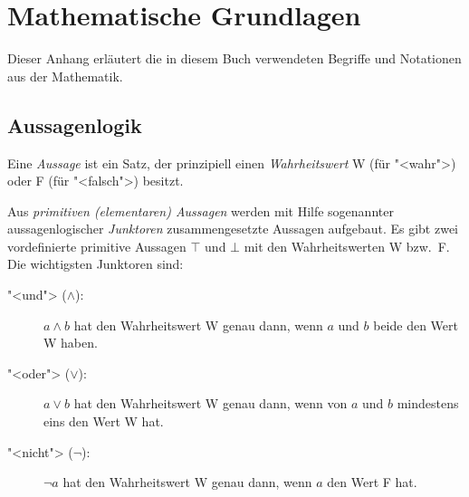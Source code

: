 
\chapter{Mathematische Grundlagen}
\label{cha:math}

Dieser Anhang erläutert
die in diesem Buch verwendeten Begriffe und Notationen
aus der Mathematik.

\section{Aussagenlogik}
\label{sec:aussagenlogik}

Eine \emph{Aussage} ist ein Satz, der prinzipiell einen \emph{Wahrheitswert}
W (für "<wahr">) oder F (für "<falsch">)
besitzt.



Aus \emph{primitiven (elementaren) Aussagen}
werden mit Hilfe sogenannter 
aussagenlogischer \emph{Junktoren} zusammengesetzte Aussagen
aufgebaut.  Es gibt zwei vordefinierte primitive Aussagen $\top$ und
$\bot$ mit den Wahrheitswerten W bzw.\ F.  Die
wichtigsten Junktoren sind:
\begin{description}
\item["<und"> ($\wedge$):] $a \wedge b$ 
        hat den Wahrheitswert W genau dann, wenn
     $a$ und $b$ beide den Wert W haben.
\item["<oder"> ($\vee$):] $a \vee b$ 
        hat den Wahrheitswert W genau dann, wenn von
     $a$ und $b$ mindestens eins den Wert W hat.
\item["<nicht"> ($\neg$):] $\neg a$ 
        hat den Wahrheitswert W genau dann, wenn $a$   
     den Wert F hat.
\end{description}

